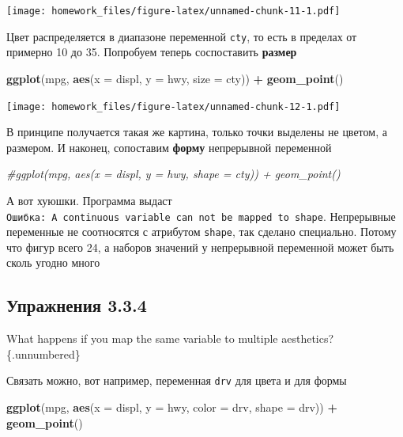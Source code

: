 \documentclass[]{book}
\newenvironment{Shaded}{\begin{snugshade}}{\end{snugshade}}
\newcommand{\KeywordTok}[1]{\textcolor[rgb]{0.13,0.29,0.53}{\textbf{#1}}}
\newcommand{\DataTypeTok}[1]{\textcolor[rgb]{0.13,0.29,0.53}{#1}}
\newcommand{\StringTok}[1]{\textcolor[rgb]{0.31,0.60,0.02}{#1}}
\newcommand{\CommentTok}[1]{\textcolor[rgb]{0.56,0.35,0.01}{\textit{#1}}}
\newcommand{\OperatorTok}[1]{\textcolor[rgb]{0.81,0.36,0.00}{\textbf{#1}}}
\newcommand{\NormalTok}[1]{#1}
\begin{document}
\texttt{[image: homework\_files/figure-latex/unnamed-chunk-11-1.pdf]}

Цвет распределяется в диапазоне переменной \texttt{cty}, то есть в
пределах от примерно 10 до 35. Попробуем теперь соспоставить
\textbf{размер}

\begin{Shaded}
\begin{Highlighting}[]
\KeywordTok{ggplot}\NormalTok{(mpg, }\KeywordTok{aes}\NormalTok{(}\DataTypeTok{x =}\NormalTok{ displ, }\DataTypeTok{y =}\NormalTok{ hwy, }\DataTypeTok{size =}\NormalTok{ cty)) }\OperatorTok{+}
\StringTok{   }\KeywordTok{geom_point}\NormalTok{()}
\end{Highlighting}
\end{Shaded}

\texttt{[image: homework\_files/figure-latex/unnamed-chunk-12-1.pdf]}

В принципе получается такая же картина, только точки выделены не цветом,
а размером. И наконец, сопоставим \textbf{форму} непрерывной переменной

\begin{Shaded}
\begin{Highlighting}[]
\CommentTok{#ggplot(mpg, aes(x = displ, y = hwy, shape = cty)) + geom_point()}
\end{Highlighting}
\end{Shaded}

А вот хуюшки. Программа выдаст
\texttt{Ошибка:\ A\ continuous\ variable\ can\ not\ be\ mapped\ to\ shape}.
Непрерывные переменные не соотносятся с атрибутом \texttt{shape}, так
сделано специально. Потому что фигур всего 24, а наборов значений у
непрерывной переменной может быть сколь угодно много

\subsection*{Упражнения 3.3.4}\label{-3.3.4}

What happens if you map the same variable to multiple aesthetics?
\{.unnumbered\}

Связать можно, вот например, переменная \texttt{drv} для цвета и для
формы

\begin{Shaded}
\begin{Highlighting}[]
\KeywordTok{ggplot}\NormalTok{(mpg, }\KeywordTok{aes}\NormalTok{(}\DataTypeTok{x =}\NormalTok{ displ, }\DataTypeTok{y =}\NormalTok{ hwy, }\DataTypeTok{color =}\NormalTok{ drv, }\DataTypeTok{shape =}\NormalTok{ drv)) }\OperatorTok{+}\StringTok{ }\KeywordTok{geom_point}\NormalTok{()}
\end{Highlighting}
\end{Shaded}
\end{document}
